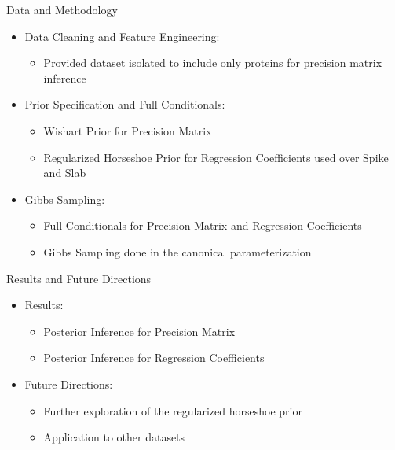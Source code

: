 \documentclass{beamer}
\begin{document}
\begin{frame}{Data and Methodology}

  \begin{itemize}
    \item Data Cleaning and Feature Engineering:
      \begin{itemize}
        \item Provided dataset isolated to include only proteins for precision matrix inference  
      \end{itemize}
    \item Prior Specification and Full Conditionals: 
      \begin{itemize}
        \item Wishart Prior for Precision Matrix 
        \item Regularized Horseshoe Prior for Regression Coefficients used over Spike and Slab
      \end{itemize}
    \item Gibbs Sampling: 
      \begin{itemize}
        \item Full Conditionals for Precision Matrix and Regression Coefficients
        \item Gibbs Sampling done in the canonical parameterization 
      \end{itemize}
  \end{itemize}
\end{frame}

\begin{frame}{Results and Future Directions}
  \begin{itemize}
    \item Results: 
      \begin{itemize}
        \item Posterior Inference for Precision Matrix 
        \item Posterior Inference for Regression Coefficients 
      \end{itemize}
    \item Future Directions: 
      \begin{itemize}
        \item Further exploration of the regularized horseshoe prior 
        \item Application to other datasets 
      \end{itemize}
  \end{itemize}
\end{frame}
\end{document}
